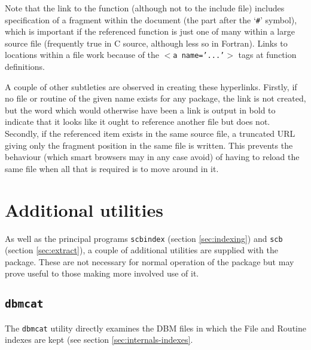 \documentclass[twoside,11pt]{article}
\newcommand{\xlabel}[1]{}
\renewcommand{\_}{\texttt{\symbol{95}}}
\begin{document}
Note that the link to the function (although not to the include file)
includes specification of a fragment within the document
(the part after the `{\tt \#}' symbol),
which is important if the referenced function is just one of many within a
large source file (frequently true in C source, although less so in Fortran).
Links to locations within a file work because of the
{\tt $<$a~name='...'$>$} tags at function definitions.

A couple of other subtleties are observed in creating these hyperlinks.
Firstly, if no file or routine of the given name exists for any package,
the link is not created, but the word which would otherwise have
been a link is output in bold to indicate that it looks
like it ought to reference another file but does not.
Secondly, if the referenced item exists in the same source file,
a truncated URL giving only the fragment position in the same
file is written.  This prevents the behaviour (which smart browsers
may in any case avoid) of having to reload the same file when all
that is required is to move around in it.


\section{\xlabel{sec:utilities}\label{sec:utilities}Additional utilities}

As well as the principal programs
{\tt scbindex} (section \ref{sec:indexing})
and
{\tt scb} (section \ref{sec:extract}),
a couple of additional utilities are supplied with the package.
These are not necessary for normal operation
of the package but may prove useful to those making more
involved use of it.




\subsection{\xlabel{sec:dbmcat}\label{sec:dbmcat}{\tt dbmcat}}

The {\tt dbmcat} utility directly examines the DBM files
in which the File and Routine indexes are kept
(see section \ref{sec:internals-indexes}.
\end{document}
